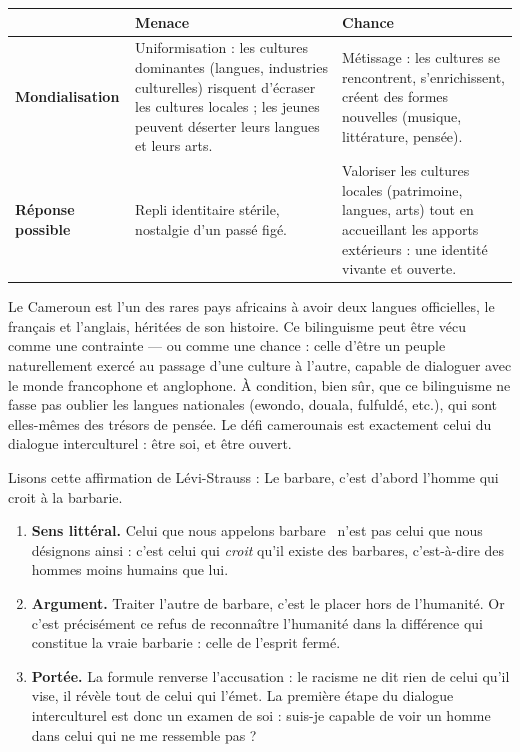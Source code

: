 \documentclass[11pt]{article}
\begin{document}
\begin{center}
\begin{tabularx}{\linewidth}{|l|X|X|}
\hline
\rowcolor{popblueL} & \textbf{Menace} & \textbf{Chance} \\
\hline
\textbf{Mondialisation} & Uniformisation : les cultures dominantes (langues, industries culturelles) risquent d'écraser les cultures locales ; les jeunes peuvent déserter leurs langues et leurs arts. & Métissage : les cultures se rencontrent, s'enrichissent, créent des formes nouvelles (musique, littérature, pensée). \\
\hline
\textbf{Réponse possible} & Repli identitaire stérile, nostalgie d'un passé figé. & Valoriser les cultures locales (patrimoine, langues, arts) tout en accueillant les apports extérieurs : une identité vivante et ouverte. \\
\hline
\end{tabularx}
\end{center}

\begin{exemplebox}
Le Cameroun est l'un des rares pays africains à avoir deux langues officielles, le français et l'anglais, héritées de son histoire. Ce bilinguisme peut être vécu comme une contrainte — ou comme une chance : celle d'être un peuple naturellement exercé au passage d'une culture à l'autre, capable de dialoguer avec le monde francophone et anglophone. À condition, bien sûr, que ce bilinguisme ne fasse pas oublier les langues nationales (ewondo, douala, fulfuldé, etc.), qui sont elles-mêmes des trésors de pensée. Le défi camerounais est exactement celui du dialogue interculturel : être soi, et être ouvert.
\end{exemplebox}

\begin{experience}
Lisons cette affirmation de Lévi-Strauss : \guillemotleft Le barbare, c'est d'abord l'homme qui croit à la barbarie. \guillemotright
\begin{enumerate}
\item \textbf{Sens littéral.} Celui que nous appelons \guillemotleft barbare \guillemotright\ n'est pas celui que nous désignons ainsi : c'est celui qui \emph{croit} qu'il existe des barbares, c'est-à-dire des hommes moins humains que lui.
\item \textbf{Argument.} Traiter l'autre de barbare, c'est le placer hors de l'humanité. Or c'est précisément ce refus de reconnaître l'humanité dans la différence qui constitue la vraie barbarie : celle de l'esprit fermé.
\item \textbf{Portée.} La formule renverse l'accusation : le racisme ne dit rien de celui qu'il vise, il révèle tout de celui qui l'émet. La première étape du dialogue interculturel est donc un examen de soi : suis-je capable de voir un homme dans celui qui ne me ressemble pas ?
\end{enumerate}
\end{experience}
\end{document}
